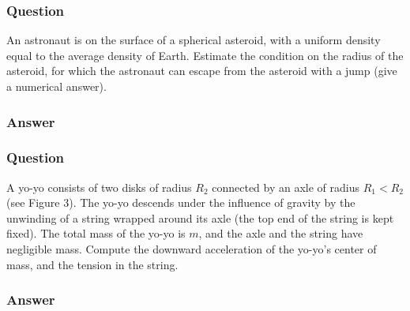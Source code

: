 \subsubsection{Question}
An astronaut is on the surface of a spherical asteroid, with a uniform density equal to the average density of Earth. Estimate the condition on the radius of the asteroid, for which the astronaut can escape from the asteroid with a jump (give a numerical answer).

\subsubsection{Answer}



\subsubsection{Question}
A yo-yo consists of two disks of radius $R_2$ connected by an axle of radius $R_1 < R_2$ (see Figure 3). The yo-yo descends under the influence of gravity by the unwinding of a string wrapped around its axle (the top end of the string is kept fixed). The total mass of the yo-yo is $m$, and the axle and the string have negligible mass. Compute the downward acceleration of the yo-yo's center of mass, and the tension in the string.

\subsubsection{Answer}

